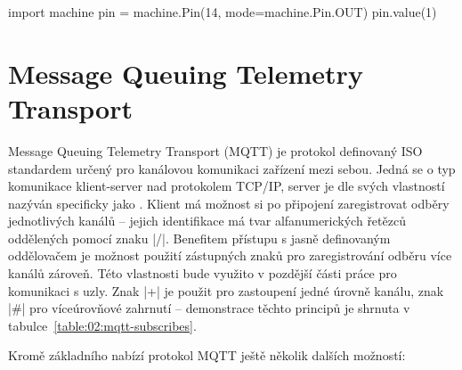 \begin{code}
    import machine
    pin = machine.Pin(14, mode=machine.Pin.OUT)
    pin.value(1)
\end{code}


\section{Message Queuing Telemetry Transport}\label{sec:message-queuing-telemetry-transport}
Message Queuing Telemetry Transport (MQTT) je protokol definovaný ISO standardem určený pro kanálovou komunikaci zařízení
mezi sebou.
Jedná se o typ komunikace klient-server nad protokolem TCP/IP, server je dle svých vlastností nazýván specificky jako .
Klient má možnost si po připojení zaregistrovat odběry jednotlivých kanálů -- jejich identifikace má tvar
alfanumerických řetězců oddělených pomocí znaku \ic|/|.
Benefitem přístupu s jasně definovaným oddělovačem je možnost použití zástupných znaků pro
zaregistrování odběru více kanálů zároveň.
Této vlastnosti bude využito v pozdější části práce pro komunikaci s uzly. Znak \ic|+|
je použit pro zastoupení jedné úrovně kanálu, znak \ic|#| pro víceúrovňové zahrnutí -- demonstrace těchto principů je shrnuta v
tabulce~\ref{table:02:mqtt-subscribes}.

Kromě základního nabízí protokol MQTT ještě několik dalších možností:

